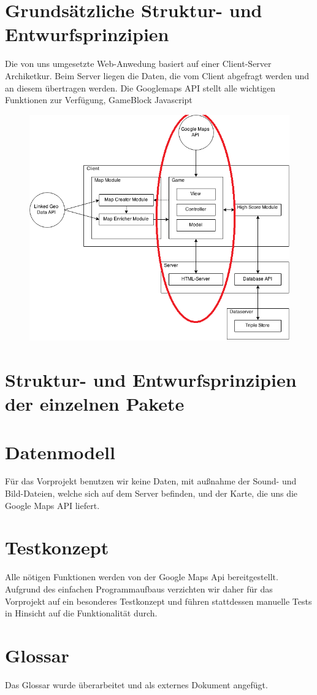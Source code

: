 \documentclass[11pt,a4paper]{article}
\begin{document}
\section{Grundsätzliche Struktur- und Entwurfsprinzipien}
Die von uns umgesetzte Web-Anwedung basiert auf einer Client-Server Archiketkur.  Beim Server liegen die Daten, die vom Client abgefragt werden und an diesem übertragen werden. Die Googlemaps API stellt alle wichtigen Funktionen zur Verfügung, GameBlock Javascript 
\begin{figure}[htb]
  \centering
  \includegraphics[scale=0.5]{arch.png}
  \label{PNFs}
\end{figure} 



\section{Struktur- und Entwurfsprinzipien der einzelnen Pakete}
\section{Datenmodell}
Für das Vorprojekt benutzen wir keine Daten, mit außnahme der Sound- und Bild-Dateien, welche sich auf dem Server befinden, und der Karte, die uns die Google Maps API liefert.

\section{Testkonzept}
Alle nötigen Funktionen werden von der Google Maps Api bereitgestellt.
Aufgrund des einfachen Programmaufbaus verzichten wir daher für das Vorprojekt auf ein besonderes Testkonzept und führen stattdessen manuelle Tests in Hinsicht auf die Funktionalität durch.
\section{Glossar}
Das Glossar wurde überarbeitet und als externes Dokument angefügt.
\end{document}
